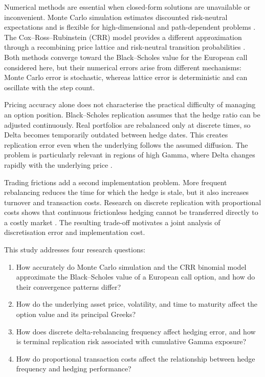 \documentclass[11pt,a4paper]{article}
\begin{document}
Numerical methods are essential when closed-form solutions are unavailable or inconvenient. Monte Carlo simulation estimates discounted risk-neutral expectations and is flexible for high-dimensional and path-dependent problems \citep{boyle1977,boylebroadieglasserman1997,glasserman2004}. The Cox--Ross--Rubinstein (CRR) model provides a different approximation through a recombining price lattice and risk-neutral transition probabilities \citep{coxrossrubinstein1979}. Both methods converge toward the Black--Scholes value for the European call considered here, but their numerical errors arise from different mechanisms: Monte Carlo error is stochastic, whereas lattice error is deterministic and can oscillate with the step count.

Pricing accuracy alone does not characterise the practical difficulty of managing an option position. Black--Scholes replication assumes that the hedge ratio can be adjusted continuously. Real portfolios are rebalanced only at discrete times, so Delta becomes temporarily outdated between hedge dates. This creates replication error even when the underlying follows the assumed diffusion. The problem is particularly relevant in regions of high Gamma, where Delta changes rapidly with the underlying price \citep{boyleemanuel1980,bertsimaskoganlo2000,gobettemam2001}.

Trading frictions add a second implementation problem. More frequent rebalancing reduces the time for which the hedge is stale, but it also increases turnover and transaction costs. Research on discrete replication with proportional costs shows that continuous frictionless hedging cannot be transferred directly to a costly market \citep{leland1985,boylevorst1992,davispanaszariphopoulou1993,toft1996}. The resulting trade-off motivates a joint analysis of discretisation error and implementation cost.

This study addresses four research questions:
\begin{enumerate}[label=\textbf{RQ\arabic*:},leftmargin=2.2cm]
    \item How accurately do Monte Carlo simulation and the CRR binomial model approximate the Black--Scholes value of a European call option, and how do their convergence patterns differ?
    \item How do the underlying asset price, volatility, and time to maturity affect the option value and its principal Greeks?
    \item How does discrete delta-rebalancing frequency affect hedging error, and how is terminal replication risk associated with cumulative Gamma exposure?
    \item How do proportional transaction costs affect the relationship between hedge frequency and hedging performance?
\end{enumerate}
\end{document}
